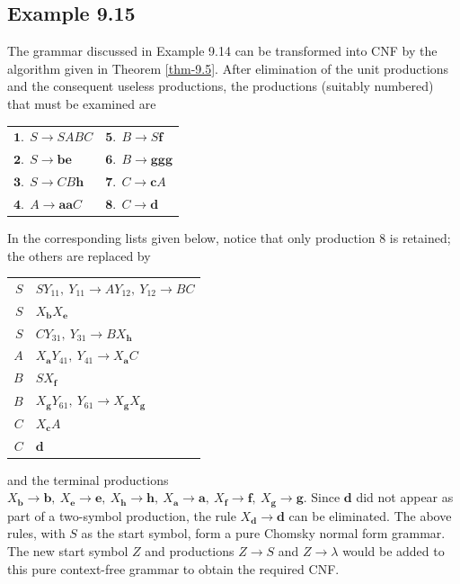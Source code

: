 \subsection*{Example 9.15}

The grammar discussed in Example 9.14 can be transformed into CNF by the
algorithm given in Theorem \ref{thm-9.5}. After elimination of the unit productions and
the consequent useless productions, the productions (suitably numbered) that
must be examined are

\begin{tabular}{l@{$\qquad\qquad\qquad$}l}
$\pmb{1.}\ \ S\rightarrow SABC$ & $\pmb{5.}\ \ B\rightarrow S\pmb{f}$ \\
$\pmb{2.}\ \ S\rightarrow\pmb{be}$ & $\pmb{6.}\ \ B\rightarrow\pmb{ggg}$ \\
$\pmb{3.}\ \ S\rightarrow CB\pmb{h}$ & $\pmb{7.}\ \ C\rightarrow\pmb{c}A$ \\
$\pmb{4.}\ \ A\rightarrow\pmb{aa}C$ & $\pmb{8.}\ \ C\rightarrow\pmb{d}$
\end{tabular}

\noindent In the corresponding lists given below, notice that only production 8
is retained; the others are replaced by
\begin{center}\begin{tabular}{r@{ $\rightarrow$ }l}
$S$ & $SY_{11},\ Y_{11}\rightarrow AY_{12},\ Y_{12}\rightarrow BC$ \\
$S$ & $X_{\pmb{b}}X_{\pmb{e}}$ \\
$S$ & $CY_{31},\ Y_{31}\rightarrow BX_{\pmb{h}}$ \\
$A$ & $X_{\pmb{a}}Y_{41},\ Y_{41}\rightarrow X_{\pmb{a}}C$ \\
$B$ & $SX_{\pmb{f}}$ \\
$B$ & $X_{\pmb{g}}Y_{61},\ Y_{61}\rightarrow X_{\pmb{g}}X_{\pmb{g}}$ \\
$C$ & $X_{\pmb{c}}A$ \\
$C$ & $\pmb{d}$
\end{tabular}\end{center}
and the terminal productions $X_{\pmb{b}}\rightarrow\pmb{b},\ X_{\pmb{e}}
\rightarrow\pmb{e},\ X_{\pmb{h}}\rightarrow\pmb{h},\ X_{\pmb{a}}\rightarrow
\pmb{a},\ X_{\pmb{f}}\rightarrow\pmb{f},\ X_{\pmb{g}}\rightarrow\pmb{g}$. Since
$\pmb{d}$ did not appear as part of a two-symbol production, the rule $X_{\pmb{d}}
\rightarrow\pmb{d}$ can be eliminated. The above rules, with $S$ as the start
symbol, form a pure Chomsky normal form grammar. The new start symbol $Z$ and
productions $Z\rightarrow S$ and $Z\rightarrow\lambda$ would be added to this
pure context-free grammar to obtain the required CNF.

